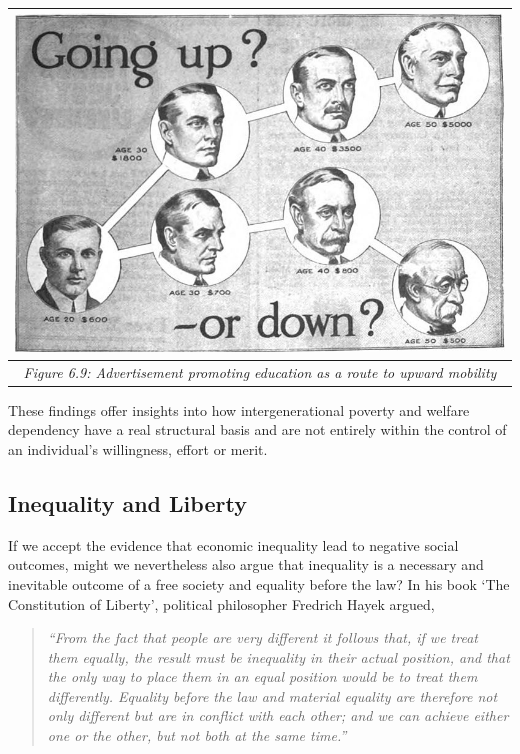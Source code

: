 \documentclass[]{tufte-handout}
\begin{document}
\begin{longtable}[]{@{}c@{}}
\toprule
\begin{minipage}[b]{0.97\columnwidth}\centering
\includegraphics{ChapterPictures/6-8-AdvertisementPromotingEducation.png}\strut
\end{minipage}\tabularnewline
\midrule
\endhead
\begin{minipage}[t]{0.97\columnwidth}\centering
\emph{Figure 6.9: Advertisement promoting education as a route to upward
mobility}\strut
\end{minipage}\tabularnewline
\bottomrule
\end{longtable}

These findings offer insights into how intergenerational poverty and
welfare dependency have a real structural basis and are not entirely
within the control of an individual's willingness, effort or merit.

\hypertarget{inequality-and-liberty}{%
\subsection{Inequality and Liberty}\label{inequality-and-liberty}}

If we accept the evidence that economic inequality lead to negative
social outcomes, might we nevertheless also argue that inequality is a
necessary and inevitable outcome of a free society and equality before
the law? In his book `The Constitution of Liberty', political
philosopher Fredrich Hayek argued,

\begin{quote}
\emph{``From the fact that people are very different it follows that, if
we treat them equally, the result must be inequality in their actual
position, and that the only way to place them in an equal position would
be to treat them differently. Equality before the law and material
equality are therefore not only different but are in conflict with each
other; and we can achieve either one or the other, but not both at the
same time.''}
\end{quote}
\end{document}
